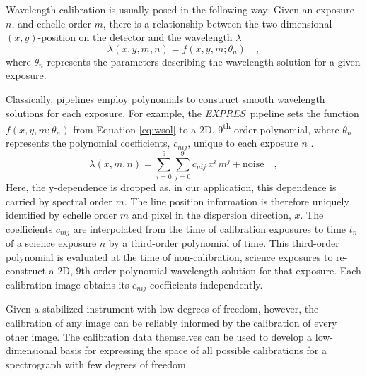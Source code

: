 \documentclass[modern]{aastex63}
\newcommand{\project}[1]{\textsl{#1}}
\newcommand{\acronym}[1]{{\small{#1}}}
\newcommand{\expres}{\project{\acronym{EXPRES}}}
\begin{document}
Wavelength calibration is usually posed in the following way: Given an exposure $n$, and echelle order $m$, there is a relationship between
the two-dimensional $(x,y)$-position on the detector and the
wavelength $\lambda$
\begin{equation}
\lambda(x,y,m,n) = f(x,y,m;\theta_{n})
\quad ,
\label{eq:wsol}
\end{equation}
where $\theta_{n}$ represents the parameters describing the wavelength solution for a given exposure.

Classically, pipelines employ polynomials to construct smooth wavelength solutions for each exposure.  For example, the \expres\ pipeline sets the function $f(x,y,m;\theta_{n})$ from Equation \ref{eq:wsol} to a 2D, 9\textsuperscript{th}-order polynomial, where $\theta_{n}$ represents the polynomial coefficients, $c_{nij}$, unique to each exposure $n$ \citep{petersburg2020}.
\begin{equation}
\lambda(x,m,n) = \sum_{i=0}^9\sum_{j=0}^9 c_{nij}\, x^i\,m^j + \mathrm{noise}
\quad ,
\label{eq:poly_wsol}
\end{equation}
Here, the y-dependence is dropped as, in our application, this dependence is carried by spectral order $m$.  The line position information is therefore uniquely identified by echelle order $m$ and pixel in the dispersion direction, $x$.  The coefficients $c_{nij}$ are interpolated from the time of calibration exposures to time $t_n$ of a science exposure $n$ by a third-order polynomial of time.  This third-order polynomial is evaluated at the time of non-calibration, science exposures to re-construct a 2D, 9th-order polynomial wavelength solution for that exposure.  Each calibration image obtains its $c_{nij}$ coefficients independently.

Given a stabilized instrument with low degrees of freedom, however, the calibration of any image can be reliably informed by the calibration of every other image.  The calibration data themselves can be used to develop a low-dimensional basis for expressing the space of all possible calibrations for a spectrograph with few degrees of freedom.
\end{document}
